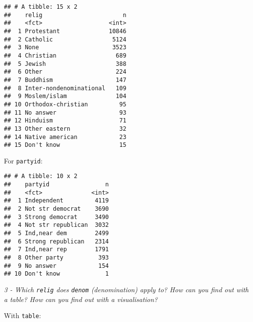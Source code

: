 \documentclass[]{article}
\newenvironment{Shaded}{\begin{snugshade}}{\end{snugshade}}
\newcommand{\KeywordTok}[1]{\textcolor[rgb]{0.13,0.29,0.53}{\textbf{#1}}}
\newcommand{\StringTok}[1]{\textcolor[rgb]{0.31,0.60,0.02}{#1}}
\newcommand{\OperatorTok}[1]{\textcolor[rgb]{0.81,0.36,0.00}{\textbf{#1}}}
\newcommand{\NormalTok}[1]{#1}
\theoremstyle{definition}
\theoremstyle{definition}
\theoremstyle{definition}
\theoremstyle{remark}
\begin{document}
\begin{Shaded}
\end{Shaded}

\begin{verbatim}
## # A tibble: 15 x 2
##    relig                       n
##    <fct>                   <int>
##  1 Protestant              10846
##  2 Catholic                 5124
##  3 None                     3523
##  4 Christian                 689
##  5 Jewish                    388
##  6 Other                     224
##  7 Buddhism                  147
##  8 Inter-nondenominational   109
##  9 Moslem/islam              104
## 10 Orthodox-christian         95
## 11 No answer                  93
## 12 Hinduism                   71
## 13 Other eastern              32
## 14 Native american            23
## 15 Don't know                 15
\end{verbatim}

For \texttt{partyid}:

\begin{Shaded}
\end{Shaded}

\begin{verbatim}
## # A tibble: 10 x 2
##    partyid                n
##    <fct>              <int>
##  1 Independent         4119
##  2 Not str democrat    3690
##  3 Strong democrat     3490
##  4 Not str republican  3032
##  5 Ind,near dem        2499
##  6 Strong republican   2314
##  7 Ind,near rep        1791
##  8 Other party          393
##  9 No answer            154
## 10 Don't know             1
\end{verbatim}

\emph{3 - Which \texttt{relig} does \texttt{denom} (denomination) apply
to? How can you find out with a table? How can you find out with a
visualisation?}

With \texttt{table}:

\begin{Shaded}
\end{Shaded}
\end{document}
